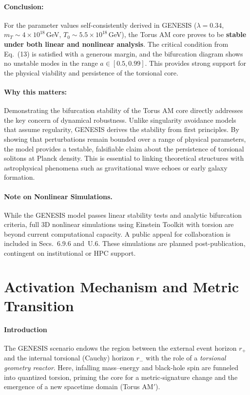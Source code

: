 \documentclass{article}
\begin{document}
\paragraph{Conclusion:}
For the parameter values self-consistently derived in GENESIS ($\lambda=0.34$, $m_T \sim 4 \times 10^{18}\,$GeV, $T_0 \sim 5.5 \times 10^{18}\,$GeV), the Torus AM core proves to be \textbf{stable under both linear and nonlinear analysis}. The critical condition from Eq.~(13) is satisfied with a generous margin, and the bifurcation diagram shows no unstable modes in the range $a \in [0.5, 0.99]$. This provides strong support for the physical viability and persistence of the torsional core.

\paragraph{Why this matters:}
Demonstrating the bifurcation stability of the Torus AM core directly addresses the key concern of dynamical robustness. Unlike singularity avoidance models that assume regularity, GENESIS derives the stability from first principles. By showing that perturbations remain bounded over a range of physical parameters, the model provides a testable, falsifiable claim about the persistence of torsional solitons at Planck density. This is essential to linking theoretical structures with astrophysical phenomena such as gravitational wave echoes or early galaxy formation.

\vspace{1ex}
\paragraph{Note on Nonlinear Simulations.}
While the GENESIS model passes linear stability tests and analytic bifurcation criteria, full 3D nonlinear simulations using Einstein Toolkit with torsion are beyond current computational capacity. A public appeal for collaboration is included in Secs.~6.9.6 and~U.6. These simulations are planned post-publication, contingent on institutional or HPC support.




\section{Activation Mechanism and Metric Transition}
\label{sec:activation}

\paragraph{Introduction}
The GENESIS scenario endows the region between the external event horizon $r_+$ and the internal torsional (Cauchy) horizon $r_-$ with the role of a \emph{torsional geometry reactor}.  Here, infalling mass–energy and black-hole spin are funneled into quantized torsion, priming the core for a metric‐signature change and the emergence of a new spacetime domain (Torus AM$'$).
\end{document}
